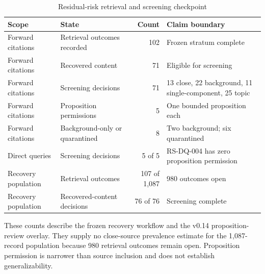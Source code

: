 \begin{table}[t]
\centering
\begin{threeparttable}
\caption{Residual-risk retrieval and screening checkpoint}
\label{tab:residual-risk-checkpoint}
\begin{tabularx}{\linewidth}{l X r X}
\toprule
Scope & State & Count & Claim boundary \\
\midrule
Forward citations & Retrieval outcomes recorded & 102 & Frozen stratum complete \\
Forward citations & Recovered content & 71 & Eligible for screening \\
Forward citations & Screening decisions & 71 & 13 close, 22 background, 11 single-component, 25 topic \\
Forward citations & Proposition permissions & 5 & One bounded proposition each \\
Forward citations & Background-only or quarantined & 8 & Two background; six quarantined \\
Direct queries & Screening decisions & 5 of 5 & RS-DQ-004 has zero proposition permission \\
Recovery population & Retrieval outcomes & 107 of 1,087 & 980 outcomes open \\
Recovery population & Recovered-content decisions & 76 of 76 & Screening complete \\
\bottomrule
\end{tabularx}
\begin{tablenotes}[flushleft]\footnotesize
\item These counts describe the frozen recovery workflow and the v0.14 proposition-review overlay. They supply no close-source prevalence estimate for the 1,087-record population because 980 retrieval outcomes remain open. Proposition permission is narrower than source inclusion and does not establish generalizability.
\end{tablenotes}
\end{threeparttable}
\end{table}

